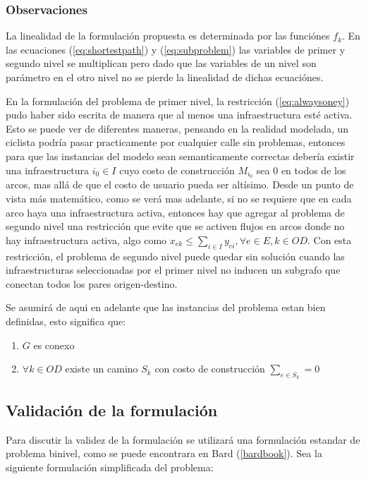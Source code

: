 \documentclass{article}
\begin{document}
  \subsubsection*{Observaciones}

  La linealidad de la formulación propuesta es determinada por las funciónes $f_k$. En las ecuaciones (\ref{eq:shortestpath}) y (\ref{eq:subproblem}) las variables de primer y segundo nivel se multiplican pero dado que las variables de un nivel son parámetro en el otro nivel no se pierde la linealidad de dichas ecuaciónes.

  En la formulación del problema de primer nivel, la restricción (\ref{eq:alwaysoney}) pudo haber sido escrita de manera que al menos una infraestructura esté activa. Esto se puede ver de diferentes maneras, pensando en la realidad modelada, un ciclista podría pasar practicamente por cualquier calle sin problemas, entonces para que las instancias del modelo sean semanticamente correctas debería existir una infraestructura $i_0 \in I$ cuyo costo de construcción $M_{i_0}$ sea 0 en todos de los arcos, mas allá de que el costo de usuario pueda ser altísimo. Desde un punto de vista más matemático, como se verá mas adelante, si no se requiere que en cada arco haya una infraestructura activa, entonces hay que agregar al problema de segundo nivel una restricción que evite que se activen flujos en arcos donde no hay infraestructura activa, algo como $x_{ek} \leq \sum_{i \in I} y_{ei}, \forall e \in E, k \in OD$. Con esta restricción, el problema de segundo nivel puede quedar sin solución cuando las infraestructuras seleccionadas por el primer nivel no inducen un subgrafo que conectan todos los pares origen-destino.

  Se asumirá de aqui en adelante que las instancias del problema estan bien definidas, esto significa que:

  \begin{enumerate}
    \item {$G$ es conexo}
    \item {$\forall k \in OD$ existe un camino $S_k$ con costo de construcción $\sum_{e \in S_k} = 0$}
  \end{enumerate}

  \subsection*{Validación de la formulación}

  Para discutir la validez de la formulación se utilizará una formulación estandar de problema binivel, como se puede encontrara en Bard (\ref{bardbook}).
  Sea la siguiente formulación simplificada del problema:
\end{document}
